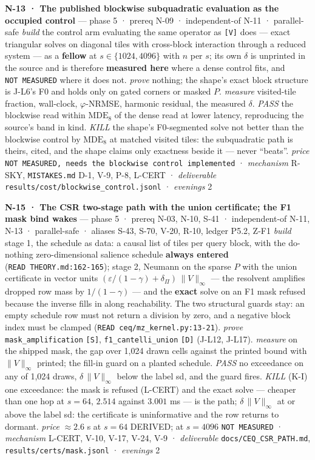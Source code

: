 \documentclass[11pt,a4paper]{article}
\theoremstyle{plain}
\theoremstyle{definition}
\theoremstyle{remark}
\begin{document}
\textbf{N-13 · The published blockwise subquadratic evaluation as the
occupied control} --- phase 5 · prereq N-09 · independent-of N-11 ·
parallel-safe \emph{build} the control arm evaluating the same operator
as \citep{zhao-2026-structuredsparse} \texttt{{[}V{]}} does --- exact
triangular solves on diagonal tiles with cross-block interaction through
a reduced system --- as a \textbf{fellow} at \(s\in\{1024,4096\}\) with
\(n\) per \(s\); its own \(\delta\) is unprinted in the source and is
therefore \textbf{measured here} where a dense control fits, and
\texttt{NOT\ MEASURED} where it does not. \emph{prove} nothing; the
shape's exact block structure is J-L6's F0 and holds only on gated
corners or masked \(P\). \emph{measure} visited-tile fraction,
wall-clock, \(\varphi\)-NRMSE, harmonic residual, the measured
\(\delta\). \emph{PASS} the blockwise read within \(\mathrm{MDE}_8\) of
the dense read at lower latency, reproducing the source's band in kind.
\emph{KILL} the shape's F0-segmented solve not better than the blockwise
control by \(\mathrm{MDE}_8\) at matched visited tiles: the subquadratic
path is theirs, cited, and the shape claims only exactness beside it ---
never ``beats''. \emph{price}
\texttt{NOT\ MEASURED,\ needs\ the\ blockwise\ control\ implemented} ·
\emph{mechanism} R-SKY, \texttt{MISTAKES.md} D-1, V-9, P-8, L-CERT ·
\emph{deliverable} \texttt{results/cost/blockwise\_control.jsonl} ·
\emph{evenings} 2

\textbf{N-15 · The CSR two-stage path with the union certificate; the F1
mask bind wakes} --- phase 5 · prereq N-03, N-10, S-41 · independent-of
N-11, N-13 · parallel-safe · aliases S-43, S-70, V-20, R-10, ledger
P5.2, Z-F1 \emph{build} stage 1, the schedule as data: a causal list of
tiles per query block, with the do-nothing zero-dimensional salience
schedule \textbf{always entered} (\texttt{READ\ THEORY.md:162-165});
stage 2, Neumann on the sparse \(P\) with the union certificate in
vector units \((\varepsilon/(1-\gamma)+\delta_\Pi)\,\|V\|_\infty\) ---
the resolvent amplifies dropped row mass by \(1/(1-\gamma)\) --- and the
\textbf{exact} solve on an F1 mask refused because the inverse fills in
along reachability. The two structural guards stay: an empty schedule
row must not return a division by zero, and a negative block index must
be clamped (\texttt{READ\ ceq/mz\_kernel.py:13-21}). \emph{prove}
\texttt{mask\_amplification} \texttt{{[}S{]}},
\texttt{f1\_cantelli\_union} \texttt{{[}D{]}} (J-L12, J-L17).
\emph{measure} on the shipped mask, the gap over 1,024 drawn cells
against the printed bound with \(\|V\|_\infty\) printed; the fill-in
guard on a planted schedule. \emph{PASS} no exceedance on any of 1,024
draws, \(\delta\,\|V\|_\infty\) below the label sd, and the guard fires.
\emph{KILL} (K-I) one exceedance: the mask is refused (L-CERT) and the
exact solve --- cheaper than one hop at \(s=64\), \(2.514\) against
\(3.001\) ms --- is the path; \(\delta\,\|V\|_\infty\) at or above the
label sd: the certificate is uninformative and the row returns to
dormant. \emph{price} \(\approx2.6\) s at \(s=64\) DERIVED; at
\(s=4096\) \texttt{NOT\ MEASURED} · \emph{mechanism} L-CERT, V-10, V-17,
V-24, V-9 · \emph{deliverable} \texttt{docs/CEQ\_CSR\_PATH.md},
\texttt{results/certs/mask.jsonl} · \emph{evenings} 2
\end{document}
